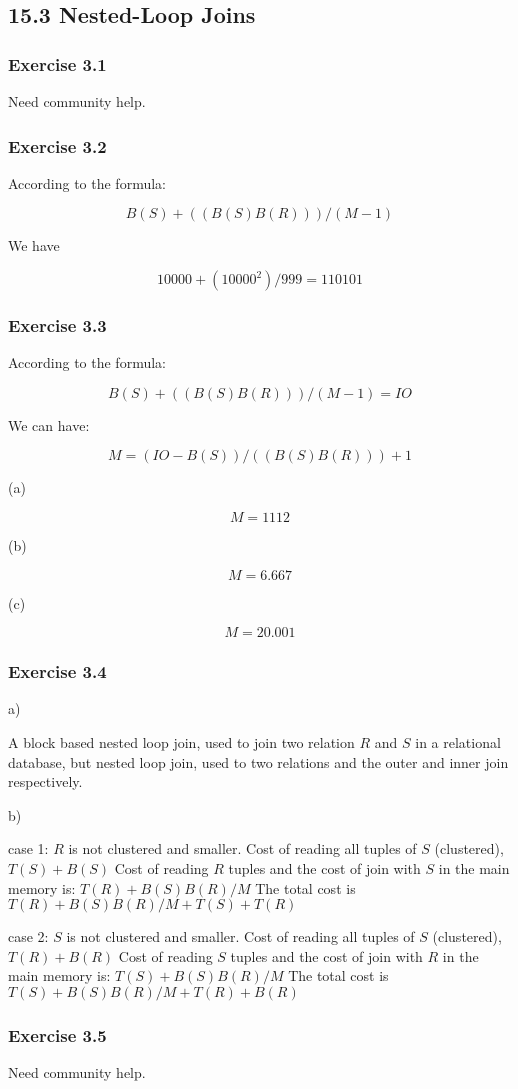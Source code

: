 \documentclass[../../main.tex]{subfiles}
\begin{document}
\subsection{15.3 Nested-Loop Joins}

\subsubsection*{Exercise 3.1}

Need community help.

\subsubsection*{Exercise 3.2}

According to the formula:

$$
B(S) + ((B(S)B(R))) / (M - 1)
$$

We have

$$
10000 + (10000 ^ 2) / 999 = 110101
$$

\subsubsection*{Exercise 3.3}

According to the formula:

$$
B(S) + ((B(S)B(R))) / (M - 1) = IO
$$

We can have:

$$
M = (IO - B(S)) / ((B(S)B(R))) + 1
$$

(a)

$$
M = 1112
$$

(b)

$$
M = 6.667
$$

(c)

$$
M = 20.001
$$

\subsubsection*{Exercise 3.4}

a)

A block based nested loop join, used to join two relation $R$ and $S$ in a
relational database, but nested loop join, used to two relations and the
outer and inner join respectively.

b)

case 1: $R$ is not clustered and smaller. Cost of reading all tuples of $S$
(clustered), $T(S)+B(S)$ Cost of reading $R$ tuples and the cost of join with $S$ in
the main memory is: $T(R)+B(S)B(R)/M $ The total cost is $T(R)+
B(S)B(R)/M+T(S)+T(R)$

case 2: $S$ is not clustered and smaller. Cost of reading all tuples of $S$
(clustered), $T(R)+B(R)$ Cost of reading $S$ tuples and the cost of join with $R$
in the main memory is: $T(S)+B(S)B(R)/M$ The total cost is $T(S)+
B(S)B(R)/M+T(R)+B(R)$

\subsubsection*{Exercise 3.5}

Need community help.
\end{document}
